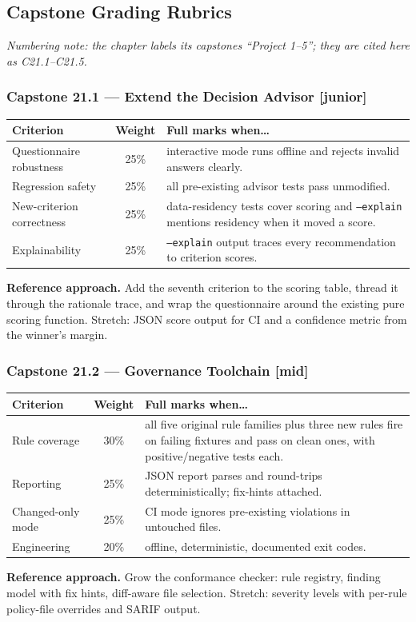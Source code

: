 \subsection{Capstone Grading Rubrics}

\emph{Numbering note: the chapter labels its capstones ``Project 1--5'';
they are cited here as C21.1--C21.5.}

\subsubsection*{Capstone 21.1 --- Extend the Decision Advisor [junior]}
\begin{center}\small
\begin{tabularx}{\textwidth}{l c X}
\toprule
\textbf{Criterion} & \textbf{Weight} & \textbf{Full marks when\ldots} \\
\midrule
Questionnaire robustness & 25\% & interactive mode runs offline and rejects invalid answers clearly. \\
Regression safety & 25\% & all pre-existing advisor tests pass unmodified. \\
New-criterion correctness & 25\% & data-residency tests cover scoring and \texttt{--explain} mentions residency when it moved a score. \\
Explainability & 25\% & \texttt{--explain} output traces every recommendation to criterion scores. \\
\bottomrule
\end{tabularx}
\end{center}
\textbf{Reference approach.} Add the seventh criterion to the scoring
table, thread it through the rationale trace, and wrap the questionnaire
around the existing pure scoring function. Stretch: JSON score output for
CI and a confidence metric from the winner's margin.

\subsubsection*{Capstone 21.2 --- Governance Toolchain [mid]}
\begin{center}\small
\begin{tabularx}{\textwidth}{l c X}
\toprule
\textbf{Criterion} & \textbf{Weight} & \textbf{Full marks when\ldots} \\
\midrule
Rule coverage & 30\% & all five original rule families plus three new rules fire on failing fixtures and pass on clean ones, with positive/negative tests each. \\
Reporting & 25\% & JSON report parses and round-trips deterministically; fix-hints attached. \\
Changed-only mode & 25\% & CI mode ignores pre-existing violations in untouched files. \\
Engineering & 20\% & offline, deterministic, documented exit codes. \\
\bottomrule
\end{tabularx}
\end{center}
\textbf{Reference approach.} Grow the conformance checker: rule registry,
finding model with fix hints, diff-aware file selection. Stretch: severity
levels with per-rule policy-file overrides and SARIF output.

